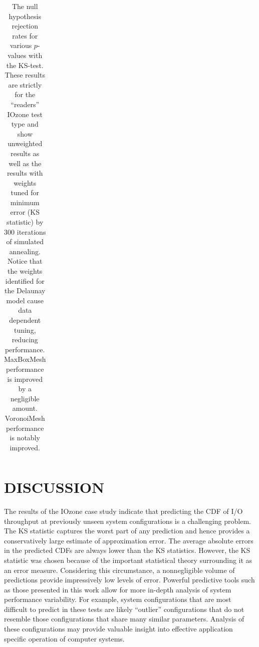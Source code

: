 \documentclass[letterpaper, 10 pt, conference]{ieeeconf}  %
\begin{document}
\begin{table}
\begin{tabular}{c|c|c|c}
    \hline
  \end{tabular}
  \caption{The null hypothesis rejection rates for various $p$-values with the KS-test. These results are strictly for the ``readers'' IOzone test type and show unweighted results as well as the results with weights tuned for minimum error (KS statistic) by 300 iterations of simulated annealing. Notice that the weights identified for the Delaunay model cause data dependent tuning, reducing performance. MaxBoxMesh performance is improved by a negligible amount. VoronoiMesh performance is notably improved.
    \vspace{-.5cm}}
  \label{tab:optimized_p_value_failure_rate}
\end{table}


\section{DISCUSSION}
\label{sec:discussion}

The results of the IOzone case study indicate that predicting the CDF of I/O throughput at previously unseen system configurations is a challenging problem. The KS statistic captures the worst part of any prediction and hence provides a conservatively large estimate of approximation error. The average absolute errors in the predicted CDFs are always lower than the KS statistics. However, the KS statistic was chosen because of the important statistical theory surrounding it as an error measure. Considering this circumstance, a nonnegligible volume of predictions provide impressively low levels of error. Powerful predictive tools such as those presented in this work allow for more in-depth analysis of system performance variability. For example, system configurations that are most difficult to predict in these tests are likely ``outlier'' configurations that do not resemble those configurations that share many similar parameters. Analysis of these configurations may provide valuable insight into effective application specific operation of computer systems.
\end{document}

